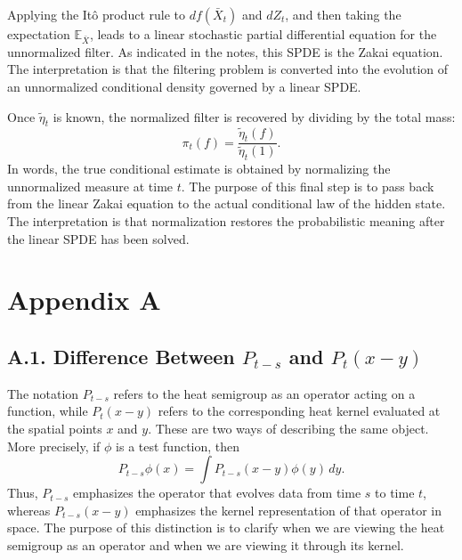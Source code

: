 \documentclass[11pt]{article}
\theoremstyle{definition}
\theoremstyle{remark}
\begin{document}
Applying the It\^o product rule to $df(\bar X_t)$ and $dZ_t$, and then taking the expectation $\mathbb E_{\bar X}$, leads to a linear stochastic partial differential equation for the unnormalized filter. As indicated in the notes, this SPDE is the Zakai equation.
The interpretation is that the filtering problem is converted into the evolution of an unnormalized conditional density governed by a linear SPDE.

Once $\tilde \eta_t$ is known, the normalized filter is recovered by dividing by the total mass:
\[
\pi_t(f)=\frac{\tilde \eta_t(f)}{\tilde \eta_t(1)}.
\]
In words, the true conditional estimate is obtained by normalizing the unnormalized measure at time $t$. The purpose of this final step is to pass back from the linear Zakai equation to the actual conditional law of the hidden state.
The interpretation is that normalization restores the probabilistic meaning after the linear SPDE has been solved.

\appendix
\section*{Appendix A}
\subsection*{A.1. Difference Between $P_{t-s}$ and $P_t(x-y)$}
The notation $P_{t-s}$ refers to the heat semigroup as an operator acting on a function, while $P_t(x-y)$ refers to the corresponding heat kernel evaluated at the spatial points $x$ and $y$. These are two ways of describing the same object. More precisely, if $\phi$ is a test function, then
\[
P_{t-s}\phi(x)=\int P_{t-s}(x-y)\phi(y)\,dy.
\]
Thus, $P_{t-s}$ emphasizes the operator that evolves data from time $s$ to time $t$, whereas $P_{t-s}(x-y)$ emphasizes the kernel representation of that operator in space.
The purpose of this distinction is to clarify when we are viewing the heat semigroup as an operator and when we are viewing it through its kernel.
\end{document}
